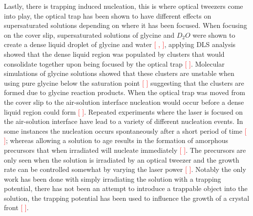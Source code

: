 Lastly, there is trapping induced nucleation, this is where optical tweezers come into play, the optical trap has been shown to have different effects on supersaturated solutions depending on where it has been focused. When focusing on the cover slip, supersaturated solutions of glycine and $D_2O$ were shown to create a dense liquid droplet of glycine and water \textcolor{red}{[ , ]}, applying DLS analysis showed that the dense liquid region was populated by clusters that would consolidate together upon being focused by the optical trap \textcolor{red}{[ ]}. Molecular simulations of glycine solutions showed that these clusters are unstable when using pure glycine below the saturation point \textcolor{red}{[ ]} suggesting that the clusters are formed due to glycine reaction products. When the optical trap was moved from the cover slip to the air-solution interface nucleation would occur before a dense liquid region could form \textcolor{red}{[ ]}. Repeated experiments where the laser is focused on the air-solution interface have lead to a variety of different nucleation events. In some instances the nucleation occurs spontaneously after a short period of time \textcolor{red}{[ ]}; whereas allowing a solution to age results in the formation of amorphous precursors that when irradiated will nucleate immediately \textcolor{red}{[ ]}. The precursors are only seen when the solution is irradiated by an optical tweezer and the growth rate can be controlled somewhat by varying the laser power \textcolor{red}{[ ]}. Notably the only work has been done with simply irradiating the solution with a trapping potential, there has not been an attempt to introduce a trappable object into the solution, the trapping potential has been used to influence the growth of a crystal front \textcolor{red}{[ ]}.

